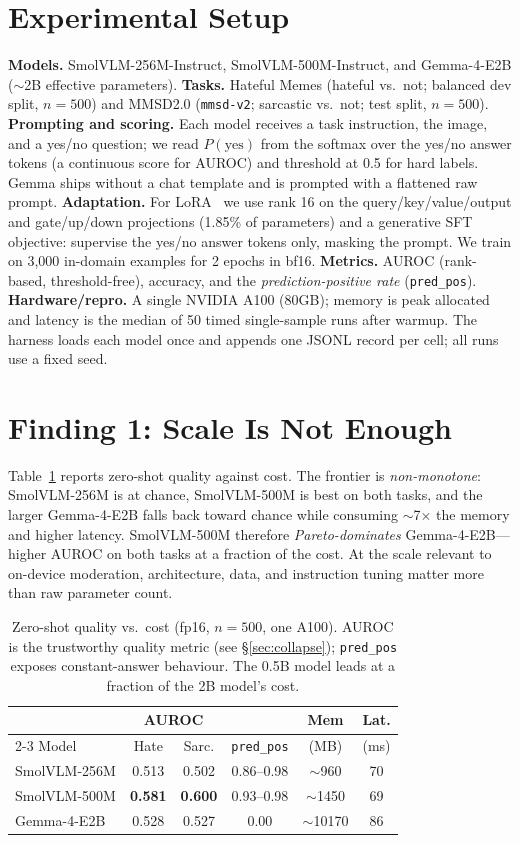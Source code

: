 \documentclass[sigconf,nonacm]{acmart}
\begin{document}
\section{Experimental Setup}\label{sec:setup}
\textbf{Models.} SmolVLM-256M-Instruct, SmolVLM-500M-Instruct, and Gemma-4-E2B
($\sim$2B effective parameters). \textbf{Tasks.} Hateful Memes (hateful vs.\ not; balanced
dev split, $n{=}500$) and MMSD2.0 (\texttt{mmsd-v2}; sarcastic vs.\ not; test split,
$n{=}500$). \textbf{Prompting and scoring.} Each model receives a task instruction, the
image, and a yes/no question; we read $P(\text{yes})$ from the softmax over the yes/no
answer tokens (a continuous score for AUROC) and threshold at 0.5 for hard labels. Gemma
ships without a chat template and is prompted with a flattened raw prompt.
\textbf{Adaptation.} For LoRA~\cite{hu2022lora} we use rank 16 on the
query/key/value/output and gate/up/down projections (1.85\% of parameters) and a
generative SFT objective: supervise the yes/no answer tokens only, masking the prompt.
We train on 3{,}000 in-domain examples for 2 epochs in bf16. \textbf{Metrics.} AUROC
(rank-based, threshold-free), accuracy, and the \emph{prediction-positive rate}
(\texttt{pred\_pos}). \textbf{Hardware/repro.} A single NVIDIA A100 (80GB); memory is peak
allocated and latency is the median of 50 timed single-sample runs after warmup. The
harness loads each model once and appends one JSONL record per cell; all runs use a fixed
seed.

\section{Finding 1: Scale Is Not Enough}\label{sec:scale}
Table~\ref{tab:zs} reports zero-shot quality against cost. The frontier is
\emph{non-monotone}: SmolVLM-256M is at chance, SmolVLM-500M is best on both tasks, and
the larger Gemma-4-E2B falls back toward chance while consuming $\sim$7$\times$ the memory
and higher latency. SmolVLM-500M therefore \emph{Pareto-dominates} Gemma-4-E2B---higher
AUROC on both tasks at a fraction of the cost. At the scale relevant to on-device
moderation, architecture, data, and instruction tuning matter more than raw parameter
count.

\begin{table}[t]
\centering
\caption{Zero-shot quality vs.\ cost (fp16, $n{=}500$, one A100). AUROC is the trustworthy
quality metric (see \S\ref{sec:collapse}); \texttt{pred\_pos} exposes constant-answer
behaviour. The 0.5B model leads at a fraction of the 2B model's cost.}
\label{tab:zs}
\begin{tabular}{lccccc}
\toprule
& \multicolumn{2}{c}{AUROC} & & Mem & Lat. \\
\cmidrule(lr){2-3}
Model & Hate & Sarc. & \texttt{pred\_pos} & (MB) & (ms) \\
\midrule
SmolVLM-256M & 0.513 & 0.502 & 0.86--0.98 & \(\sim\)960 & 70 \\
SmolVLM-500M & \textbf{0.581} & \textbf{0.600} & 0.93--0.98 & \(\sim\)1450 & 69 \\
Gemma-4-E2B  & 0.528 & 0.527 & 0.00 & \(\sim\)10170 & 86 \\
\bottomrule
\end{tabular}
\end{table}
\end{document}
